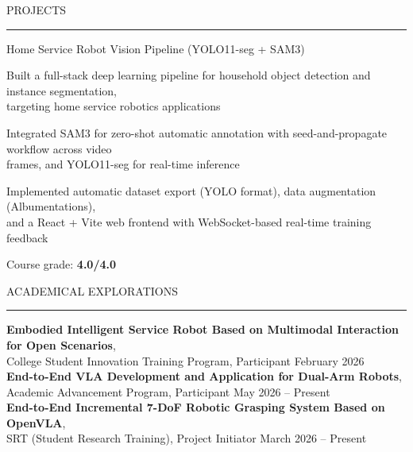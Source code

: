 \documentclass{resume} %
\renewenvironment{rSection}[1]{
\sectionskip
\textcolor{TsinghuaPurple}{\MakeUppercase{#1}}
\sectionlineskip
\hrule
\begin{list}{}{
\setlength{\leftmargin}{0em}
}
\item[]
}{
\end{list}
}
\begin{document}
\begin{rSection}{PROJECTS}
\begin{rSubsection}{Home Service Robot Vision Pipeline (YOLO11-seg + SAM3)}
\item Built a full-stack deep learning pipeline for household object detection and instance segmentation, \\targeting home service robotics applications
\item Integrated SAM3 for zero-shot automatic annotation with seed-and-propagate workflow across video \\frames, and YOLO11-seg for real-time inference
\item Implemented automatic dataset export (YOLO format), data augmentation (Albumentations), \\and a React + Vite web frontend with WebSocket-based real-time training feedback
\item Course grade: \textbf{4.0/4.0}

\end{rSubsection}

\end{rSection} 



\begin{rSection}{Academical Explorations} \itemsep -3pt

{\textbf{Embodied Intelligent Service Robot Based on Multimodal Interaction for Open Scenarios}, \\College Student Innovation Training Program, Participant} \hfill February 2026 \\
{\textbf{End-to-End VLA Development and Application for Dual-Arm Robots}, \\Academic Advancement Program, Participant} \hfill May 2026 -- Present \\
{\textbf{End-to-End Incremental 7-DoF Robotic Grasping System Based on OpenVLA}, \\SRT (Student Research Training), Project Initiator} \hfill March 2026 -- Present \\

\end{rSection}  
 
  
\end{document}
